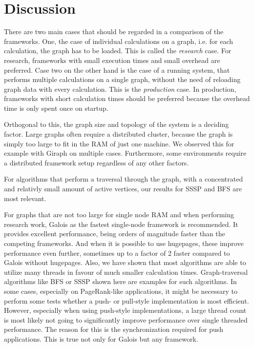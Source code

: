 
\section{Discussion}

There are two main cases that should be regarded in a comparison of the frameworks. One, the case of individual calculations on a graph, i.e. for each calculation, the graph has to be loaded. This is called the \emph{research} case. For research, frameworks with small execution times and small overhead are preferred. Case two on the other hand is the case of a running system, that performs multiple calculations on a single graph, without the need of reloading graph data with every calculation. This is the \emph{production} case.
In production, frameworks with short calculation times should be preferred because the overhead time is only spent once on startup.

Orthogonal to this, the graph size and topology of the system is a deciding factor. Large graphs often require a distributed cluster, because the graph is simply too large to fit in the RAM of just one machine. We observed this for example with Giraph on multiple cases.
Furthermore, some environments require a distributed framework setup regardless of any other factors.


For algorithms that perform a traversal through the graph, with a concentrated and relativly small amount of active vertices, our results for SSSP and BFS are most relevant.


For graphs that are not too large for single node RAM and when performing research work, Galois as the fastest single-node framework is recommended.
It provides excellent performance, being orders of magnitude faster than the competing frameworks. And when it is possible to use hugepages, these improve performance even further, sometimes up to a factor of 2 faster compared to Galois without hugepages.
Also, we have shown that most algorithms are able to utilize many threads in favour of much smaller calculation times. Graph-traversal algorithms like BFS or SSSP shown here are examples for such algorithms.
In some cases, especially on PageRank-like applications, it might be necessary to perform some tests whether a push- or pull-style implementation is most efficient.
However, especially when using push-style implementations, a large thread count is most likely not going to significantly improve performance over single threaded performance. The reason for this is the synchronization required for push applications. This is true not only for Galois but any framework.


